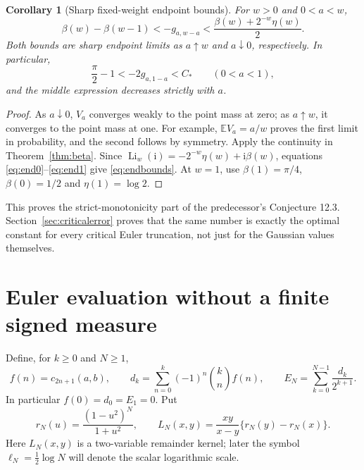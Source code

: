 \documentclass[11pt]{article}
\numberwithin{equation}{section}
\newtheorem{corollary}[theorem]{Corollary}
\theoremstyle{definition}\newtheorem{definition}[theorem]{Definition}
\theoremstyle{remark}\newtheorem{remark}[theorem]{Remark}
\DeclareMathOperator{\Li}{Li}
\newcommand{\ii}{\mathrm i}
\newcommand{\E}{\mathbb E}
\newcommand{\CC}{C_*}
\begin{document}
\begin{corollary}[Sharp fixed-weight endpoint bounds]\label{cor:endbounds}
For $w>0$ and $0<a<w$,
\begin{equation}\label{eq:endbounds}
 \beta(w)-\beta(w-1)
 <-g_{a,w-a}
 <\frac{\beta(w)+2^{-w}\eta(w)}2.
\end{equation}
Both bounds are sharp endpoint limits as $a\uparrow w$ and $a\downarrow0$,
respectively. In particular,
\begin{equation}\label{eq:criticalrange}
 \frac\pi2-1<-2g_{a,1-a}<\CC\qquad(0<a<1),
\end{equation}
and the middle expression decreases strictly with $a$.
\end{corollary}
\begin{proof}
As $a\downarrow0$, $V_a$ converges weakly to the point mass at zero;
as $a\uparrow w$, it converges to the point mass at one. For example,
$\E V_a=a/w$ proves the first limit in probability, and the second
follows by symmetry. Apply the continuity in Theorem~\ref{thm:beta}.
Since
$\Li_w(\ii)=-2^{-w}\eta(w)+\ii\beta(w)$, equations
\eqref{eq:end0}--\eqref{eq:end1} give \eqref{eq:endbounds}.
At $w=1$, use $\beta(1)=\pi/4$, $\beta(0)=1/2$ and $\eta(1)=\log2$.
\end{proof}

This proves the strict-monotonicity part of the predecessor's
Conjecture 12.3. Section~\ref{sec:criticalerror} proves that the same
number is exactly the optimal constant for every critical Euler
truncation, not just for the Gaussian values themselves.

\section{Euler evaluation without a finite signed measure}
\label{sec:eulerall}

Define, for $k\ge0$ and $N\ge1$,
\begin{equation}\label{eq:eulerdef}
 f(n)=c_{2n+1}(a,b),\qquad
 d_k=\sum_{n=0}^k(-1)^n\binom kn f(n),\qquad
 E_N=\sum_{k=0}^{N-1}\frac{d_k}{2^{k+1}}.
\end{equation}
In particular $f(0)=d_0=E_1=0$. Put
\begin{equation}\label{eq:rN}
 r_N(u)=\frac{(1-u^2)^N}{1+u^2},\qquad
 L_N(x,y)=\frac{xy}{x-y}\{r_N(y)-r_N(x)\}.
\end{equation}
Here $L_N(x,y)$ is a two-variable remainder kernel; later the symbol
$\ell_N=\tfrac12\log N$ will denote the scalar logarithmic scale.
\end{document}
